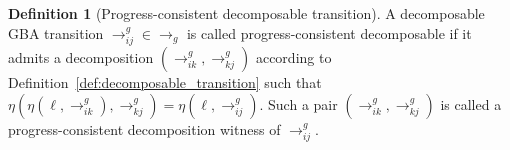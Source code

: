 \documentclass[lettersize,journal]{IEEEtran}
\theoremstyle{italiclemma}
\theoremstyle{italiclemma}
\theoremstyle{definition}
\newtheorem{definition}{Definition}
\begin{document}
 
\begin{definition}[Progress-consistent decomposable transition]
\label{def:progress_consistent_decomposable_transition}
A decomposable GBA transition $\rightarrow^g_{ij}\in\rightarrow_g$ is called progress-consistent decomposable if it admits a decomposition 
$(\rightarrow^g_{ik},\rightarrow^g_{kj})$ according to
Definition~\ref{def:decomposable_transition} such that
$\eta(\eta(\ell,\rightarrow^g_{ik}),\rightarrow^g_{kj})
=\eta(\ell,\rightarrow^g_{ij})$. Such a pair
$(\rightarrow^g_{ik},\rightarrow^g_{kj})$ is called a progress-consistent decomposition
witness of $\rightarrow^g_{ij}$.
\end{definition}

\end{document}
